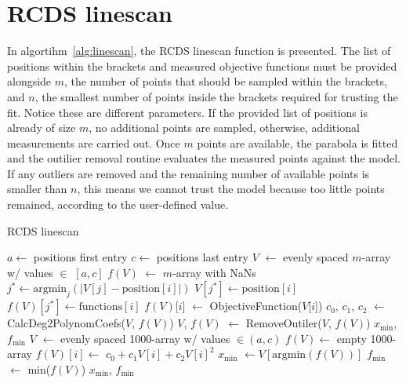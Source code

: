 \section{RCDS linescan}
In algortihm~\ref{alg:linescan}, the RCDS linescan function is presented. The list of positions within the brackets and measured objective functions must be provided alongside $m$, the number of points that should be sampled within the brackets, and $n$, the smallest number of points inside the brackets required for trusting the fit. Notice these are different parameters. If the provided list of positions is already of size $m$, no additional points are sampled, otherwise, additional measurements are carried out. Once $m$ points are available,  the parabola is fitted and the outilier removal routine evaluates the measured points against the model. If any outliers are removed and the remaining number of available points is smaller than $n$, this means we cannot trust the model because too little points remained, according to the user-defined value.

\begin{algorithm}
    \caption{RCDS linescan}\label{alg:linescan}
    \begin{algorithmic}[1]
        \State $a\gets$ positions first entry
        \State $c\gets$ positions last entry
        \State $V$ $\gets$ evenly spaced $m$-array w/ values $\in$ $[a, c]$
        \State $f(V)$ $\gets$ $m$-array with NaNs
            \State $j^*\gets \text{argmin}_{j}(|V[j] - \text{position}[i]|)$
            \State $V[j^*]\gets \text{position}[i]$
            \State $f(V)[j^*]\gets \text{functions}[i]$
        \EndFor
            \State $f(V)$[$i$] $\gets$ ObjectiveFunction($V$[$i$])
        \EndFor
        \State $c_0$, $c_1$, $c_2$ $\gets$ CalcDeg2PolynomCoefs($V$, $f(V)$)
        \State $V$, $f(V)$ $\gets$ RemoveOutiler($V$, $f(V)$)
            \State \Return $x_{\text{min}}$, $f_{\text{min}}$
        \EndIf
        \State $V$ $\gets$ evenly spaced 1000-array w/ values $\in(a,c)$
        \State $f(V)\gets$ empty 1000-array
            \State $f(V)[i] \gets$ $c_0+c_1V[i]+c_2V[i]^2$
        \EndFor
        \State $x_{\text{min}}$ $\gets V[\text{argmin}(f(V))]$
        \State $f_\text{min}$ $\gets$ min($f(V)$)
        \State \Return $x_{\text{min}}$, $f_\text{min}$
    \EndFunction
    \end{algorithmic}
    \end{algorithm}

